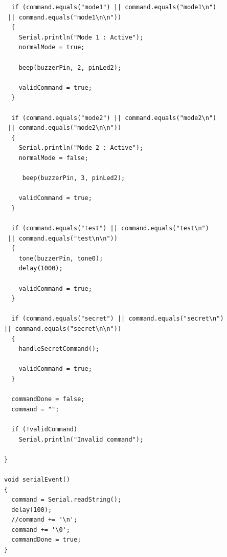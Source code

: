 \documentclass[a4paper,12pt]{report}
\begin{document}
\begin{frame}
\begin{lstlisting}
  if (command.equals("mode1") || command.equals("mode1\n")
 || command.equals("mode1\n\n"))
  {
    Serial.println("Mode 1 : Active");
    normalMode = true;

    beep(buzzerPin, 2, pinLed2);

    validCommand = true;
  }

  if (command.equals("mode2") || command.equals("mode2\n")
 || command.equals("mode2\n\n"))
  {
    Serial.println("Mode 2 : Active");
    normalMode = false;

     beep(buzzerPin, 3, pinLed2);
    
    validCommand = true;
  }

  if (command.equals("test") || command.equals("test\n")
 || command.equals("test\n\n"))
  {
    tone(buzzerPin, tone0);
    delay(1000);

    validCommand = true;
  }

  if (command.equals("secret") || command.equals("secret\n") 
|| command.equals("secret\n\n"))
  {
    handleSecretCommand();

    validCommand = true;
  }

  commandDone = false;
  command = "";

  if (!validCommand)
    Serial.println("Invalid command");

}

void serialEvent()
{
  command = Serial.readString();
  delay(100);
  //command += '\n';
  command += '\0';
  commandDone = true;
}

\end{lstlisting}
\end{frame}
\end{document}
